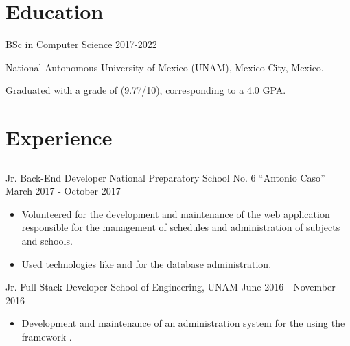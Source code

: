 \documentclass{resume}
\begin{document}
  \begin{paracol}{2}
    
    \section{Education}
      
      \datedsubsection%
        {BSc in Computer Science}
        {2017-2022}
        
        \noindent
        National Autonomous University of Mexico (UNAM), \newline Mexico City,
        Mexico.

        \vspace{0.5em}
        
        \noindent
        Graduated with a grade of (9.77/10), corresponding to a 4.0 GPA. 

        \noindent

    \section{Experience}
    
      \subsection{\large{}}

      \experience%
          {Jr. Back-End Developer}
          {National Preparatory School No. 6 ``Antonio Caso''}
          {March 2017 - October 2017}
          {
            \begin{itemize}
            \item
              Volunteered for the development and maintenance of the web
              application responsible for the management of schedules and
              administration of subjects and schools.
              
            \item
              Used technologies like  and  for the
              database administration.
            \end{itemize}
          }
        
      \experience%
          {Jr. Full-Stack Developer}
          {School of Engineering, UNAM}
          {June 2016 - November 2016}
          {
            \begin{itemize}
              \item Development and maintenance of an administration system for
                the 
                using the framework .
                

\end{itemize}}
\end{paracol}
\end{document}
